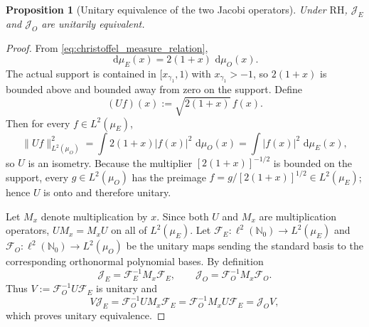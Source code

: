 \documentclass[preprint,12pt]{elsarticle}
\numberwithin{equation}{section}
\theoremstyle{plain}
\newtheorem{proposition}[theorem]{Proposition}
\theoremstyle{definition}
\theoremstyle{remark}
\newcommand{\RH}{\mathrm{RH}}
\newcommand{\dd}{\,\mathrm d}
\begin{document}
\begin{proposition}[Unitary equivalence of the two Jacobi operators]
\label{prop:Jacobi_unitary_equivalence}
Under $\RH$, $\mathcal J_E$ and $\mathcal J_O$ are unitarily equivalent.
\end{proposition}

\begin{proof}
From \eqref{eq:christoffel_measure_relation},
\begin{equation}
\dd\mu_E(x)=2(1+x)\,\dd\mu_O(x).
\label{eq:measure_RN_repeat}
\end{equation}
The actual support is contained in $[x_{\gamma_1},1)$ with $x_{\gamma_1}>-1$, so $2(1+x)$ is bounded above and bounded away from zero on the support.  Define
\begin{equation}
(Uf)(x):=\sqrt{2(1+x)}\,f(x).
\label{eq:measure_unitary_map}
\end{equation}
Then for every $f\in L^2(\mu_E)$,
\begin{equation}
\|Uf\|_{L^2(\mu_O)}^2
=\int 2(1+x)|f(x)|^2\,\dd\mu_O(x)
=\int |f(x)|^2\,\dd\mu_E(x),
\end{equation}
so $U$ is an isometry.  Because the multiplier $[2(1+x)]^{-1/2}$ is bounded on the support, every $g\in L^2(\mu_O)$ has the preimage
$f=g/[2(1+x)]^{1/2}\in L^2(\mu_E)$; hence $U$ is onto and therefore unitary.

Let $M_x$ denote multiplication by $x$.  Since both $U$ and $M_x$ are multiplication operators,
$UM_x=M_xU$ on all of $L^2(\mu_E)$.  Let $\mathcal F_E:\ell^2(\mathbb N_0)\to L^2(\mu_E)$ and
$\mathcal F_O:\ell^2(\mathbb N_0)\to L^2(\mu_O)$ be the unitary maps sending the standard basis to the corresponding orthonormal polynomial bases.  By definition
\begin{equation}
\mathcal J_E=\mathcal F_E^{-1}M_x\mathcal F_E,
\qquad
\mathcal J_O=\mathcal F_O^{-1}M_x\mathcal F_O.
\end{equation}
Thus $V:=\mathcal F_O^{-1}U\mathcal F_E$ is unitary and
\begin{equation}
V\mathcal J_E
=\mathcal F_O^{-1}UM_x\mathcal F_E
=\mathcal F_O^{-1}M_xU\mathcal F_E
=\mathcal J_OV,
\end{equation}
which proves unitary equivalence.
\end{proof}
\end{document}
